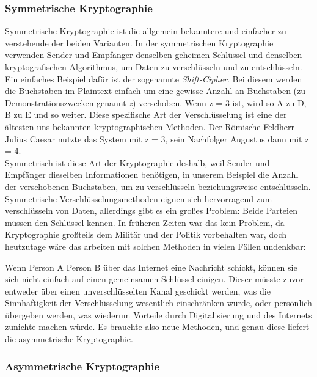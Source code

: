 \documentclass[12pt]{article}
\begin{document}
\subsubsection{Symmetrische Kryptographie}

Symmetrische Kryptographie ist die allgemein bekanntere und einfacher zu verstehende der beiden Varianten. In der symmetrischen Kryptographie verwenden Sender und Empfänger denselben geheimen Schlüssel und denselben kryptografischen Algorithmus, um Daten zu verschlüsseln und zu entschlüsseln. \\

Ein einfaches Beispiel dafür ist der sogenannte \textit{Shift-Cipher}. Bei diesem werden die Buchstaben im Plaintext einfach um eine gewisse Anzahl an Buchstaben (zu Demonstrationszwecken genannt \textit{z}) verschoben. Wenn z = 3 ist, wird so A zu D, B zu E und so weiter. Diese spezifische Art der Verschlüsselung ist eine der ältesten uns bekannten kryptographischen Methoden. Der Römische Feldherr Julius Caesar nutzte das System mit z = 3, sein Nachfolger Augustus dann mit z = 4. \cite{Uhl2022Krypto} \\

Symmetrisch ist diese Art der Kryptographie deshalb, weil Sender und Empfänger dieselben Informationen benötigen, in unserem Beispiel die Anzahl der verschobenen Buchstaben, um zu verschlüsseln beziehungsweise entschlüsseln. \\

Symmetrische Verschlüsselungsmethoden eignen sich hervorragend zum verschlüsseln von Daten, allerdings gibt es ein großes Problem: Beide Parteien müssen den Schlüssel kennen. In früheren Zeiten war das kein Problem, da Kryptographie großteils dem Militär und der Politik vorbehalten war, doch heutzutage wäre das arbeiten mit solchen Methoden in vielen Fällen undenkbar:

Wenn Person A Person B über das Internet eine Nachricht schickt, können sie sich nicht einfach auf einen gemeinsamen Schlüssel einigen. Dieser müsste zuvor entweder über einen unverschlüsselten Kanal geschickt werden, was die Sinnhaftigkeit der Verschlüsselung wesentlich einschränken würde, oder persönlich übergeben werden, was wiederum Vorteile durch Digitalisierung und des Internets zunichte machen würde. Es brauchte also neue Methoden, und genau diese liefert die asymmetrische Kryptographie. \cite{mavroeidis2018impact}

\subsubsection{Asymmetrische Kryptographie}
\end{document}
